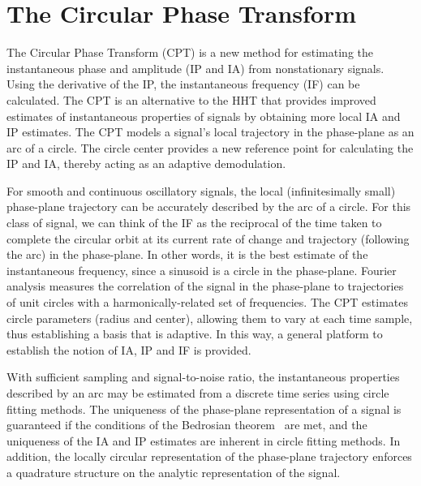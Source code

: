 \documentclass[a4paper]{IEEEtran}
\begin{document}
\section{The Circular Phase Transform}\label{sect:CPTDescriptionSection}
The Circular Phase Transform (CPT) is a new method for estimating the instantaneous phase and amplitude (IP and IA) from nonstationary signals. Using the derivative of the IP, the instantaneous frequency (IF) can be calculated. The CPT is an alternative to the HHT that provides improved estimates of instantaneous properties of signals by obtaining more local IA and IP estimates. The CPT models a signal's local trajectory in the phase-plane as an arc of a circle. The circle center provides a new reference point for calculating the IP and IA, thereby acting as an adaptive demodulation.

For smooth and continuous oscillatory signals, the local (infinitesimally small) phase-plane trajectory can be accurately described by the arc of a circle. For this class of signal, we can think of the IF as the reciprocal of the time taken to complete the circular orbit at its current rate of change and trajectory (following the arc) in the phase-plane. In other words, it is the best estimate of the instantaneous frequency, since a sinusoid is a circle in the phase-plane. Fourier analysis measures the correlation of the signal in the phase-plane to trajectories of unit circles with a harmonically-related set of frequencies. The CPT estimates circle parameters (radius and center), allowing them to vary at each time sample, thus establishing a basis that is adaptive. In this way, a general platform to establish the notion of IA, IP and IF is provided.

With sufficient sampling and signal-to-noise ratio, the instantaneous properties described by an arc may be estimated from a discrete time series using circle fitting methods. The uniqueness of the phase-plane representation of a signal is guaranteed if the conditions of the Bedrosian theorem~\cite{Bedrosian1963} are met, and the uniqueness of the IA and IP estimates are inherent in circle fitting methods. In addition, the locally circular representation of the phase-plane trajectory enforces a quadrature structure on the analytic representation of the signal.
\end{document}
